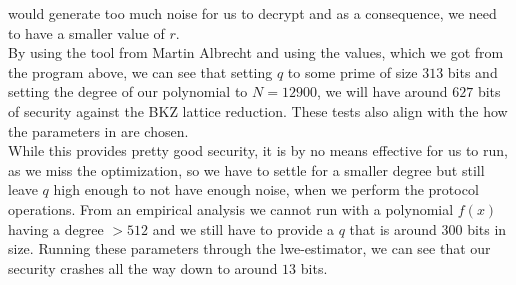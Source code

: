 \documentclass[../main.tex]{subfiles}
\begin{document}
	would generate too much noise for us to decrypt and as a consequence, we need to have a smaller value of $r$.
	\\[5mm]
    By using the tool from Martin Albrecht %
    and using the values, which we got from the program above, we can see that setting $q$ to some prime
    of size $313$ bits and setting the degree of our polynomial to $N = 12900$, we will have around $627$ bits
    of security against the BKZ lattice reduction.
    These tests also align with the how the parameters in \cite{damgaard2012multiparty} are chosen.
    \\[5mm]
    While this provides pretty good security, it is by no means effective for us to run, as we miss the optimization, %
    so we have to settle for a smaller degree but still leave $q$ high enough to not have enough noise, when 
    we perform the protocol operations.
    From an empirical analysis we cannot run with a polynomial $f(x)$ having a degree $> 512$ and we still have to provide a $q$ that is
    around $300$ bits in size.
    Running these parameters through the lwe-estimator, we can see that our security crashes all the way
    down to around $13$ bits. %
\end{document}
